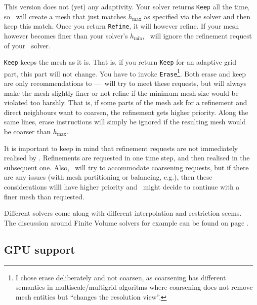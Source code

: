 \noindent
This version does not (yet) any adaptivity. 
Your solver returns \texttt{Keep} all the time, so \Peano\ will create a mesh
that just matches $h_{\text{max}}$ as specified via the solver and then keep
this match.
Once you return \texttt{Refine}, it will however refine.
If your mesh however becomes finer than your solver's $h_{\text{min}}$, \Peano\
will ignore the refinement request of your \ExaHyPE\ solver.


\texttt{Keep} keeps the mesh as it is.
That is, if you return \texttt{Keep} for an adaptive grid part, this part will
not change.
You have to invoke \texttt{Erase}\footnote{I chose erase deliberately and not
coarsen, as coarsening has different semantics in multiscale/multigrid
algoritms where coarsening does not remove mesh entities but ``changes the
resolution view''.}.
Both erase and keep are only recommendations to \Peano---\Peano\ will try to
meet these requests, but will always make the mesh slightly finer or not refine
if the minimum mesh size would be violated too harshly.
That is, if some parts of the mesh ask for a refinement and direct neighbours
want to coarsen, the refinement gets higher priority.
Along the same lines, erase instructions will simply be ignored if the resulting
mesh would be coarser than $h_{\text{max}}$.


\begin{remark}
It is important to keep in mind that refinement requests are not
immediately realised by \Peano. 
Refinements are requested in one time step, and then realised in the subsequent
one.
Also, \Peano\ will try to accommodate coarsening requests, but if there are any issues (with mesh partitioning or balancing, e.g.), then these
considerations willl have higher priority and \Peano\ might decide to continue with a finer mesh than requested.
\end{remark}


\noindent
Different solvers come along with different interpolation and restriction seems.
The discussion around Finite Volume solvers for example can be found on page
\pageref{section:exahype:finite-volumes:interpolation-schemes}.


\subsection{GPU support}
\label{section:exahype:gpu-support}

